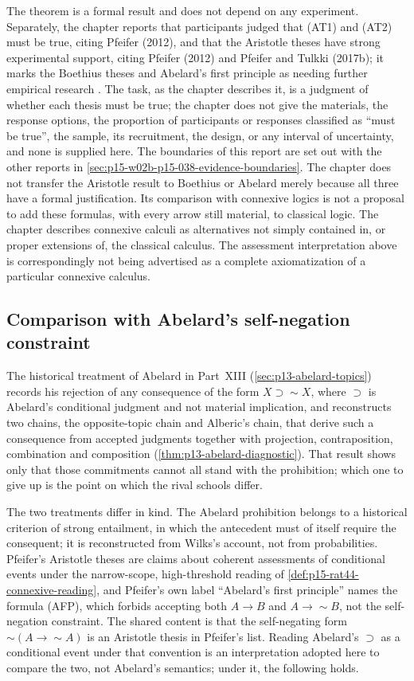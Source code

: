 The theorem is a formal result and does not depend on any experiment.
Separately, the chapter reports that participants judged that (AT1)
and (AT2) must be true, citing Pfeifer (2012), and that the Aristotle
theses have strong experimental support, citing Pfeifer (2012) and
Pfeifer and Tulkki (2017b); it marks the Boethius theses and Abelard's
first principle as needing further empirical research
\cite[p.~280]{Pfeifer2021ProbabilityLogic}. The task, as the chapter
describes it, is a judgment of whether each thesis must be true; the
chapter does not give the materials, the response options, the
proportion of participants or responses classified as ``must be
true'', the sample, its recruitment, the design, or any interval of
uncertainty, and none is supplied here. The boundaries of this report
are set out with the other reports in
\cref{sec:p15-w02b-p15-038-evidence-boundaries}. The chapter does not
transfer the Aristotle result to Boethius or Abelard merely because all
three have a formal justification.
Its comparison with connexive logics is not a proposal to add these
formulas, with every arrow still material, to classical logic. The
chapter describes connexive calculi as alternatives not simply contained
in, or proper extensions of, the classical calculus. The assessment
interpretation above is correspondingly not being advertised as a
complete axiomatization of a particular connexive calculus.

\subsection{Comparison with Abelard's self-negation constraint}
\label{sec:p15-w02b-p15-038-abelard}

The historical treatment of Abelard in Part~XIII
(\cref{sec:p13-abelard-topics}) records his rejection of any
consequence of the form \(X\supset\sim X\), where \(\supset\) is
Abelard's conditional judgment and not material implication, and
reconstructs two chains, the opposite-topic chain and Alberic's chain,
that derive such a consequence from accepted judgments together with
projection, contraposition, combination and composition
(\cref{thm:p13-abelard-diagnostic}). That result shows only that those
commitments cannot all stand with the prohibition; which one to give up
is the point on which the rival schools differ.

The two treatments differ in kind. The Abelard prohibition belongs to a
historical criterion of strong entailment, in which the antecedent must
of itself require the consequent; it is reconstructed from Wilks's
account, not from probabilities. Pfeifer's Aristotle theses are claims
about coherent assessments of conditional events under the
narrow-scope, high-threshold reading of
\cref{def:p15-rat44-connexive-reading}, and Pfeifer's own label
``Abelard's first principle'' names the formula (AFP), which forbids
accepting both \(A\to B\) and \(A\to\sim B\), not the self-negation
constraint. The shared content is that the self-negating form
\(\sim(A\to\sim A)\) is an Aristotle thesis in Pfeifer's list. Reading
Abelard's \(\supset\) as a conditional event under that convention is an
interpretation adopted here to compare the two, not Abelard's semantics;
under it, the following holds.

